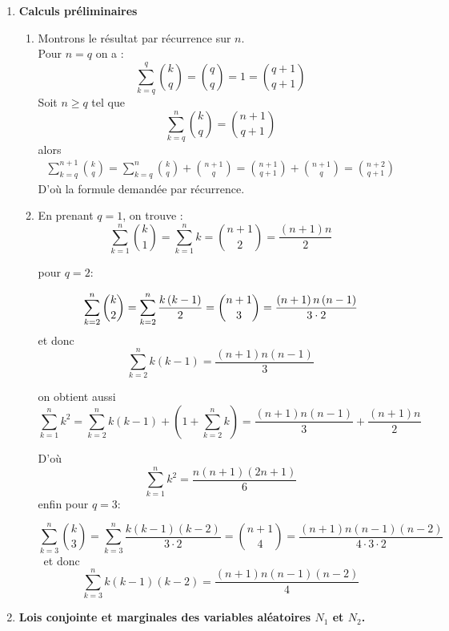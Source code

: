 \begin{enumerate}
\item \textbf{Calculs pr\'eliminaires}

\begin{enumerate}
\item Montrons le résultat par récurrence sur $n$.\\
Pour $n=q$ on a :%
\begin{equation*}
\sum\limits_{k=q}^{q}\binom{k}{q}=\binom{q}{q}=1=\binom{q+1}{q+1}
\end{equation*}%
Soit $n\geq q$ tel que $$\sum\limits_{k=q}^{n}\binom{k}{q}=\binom{n+1}{q+1}$$
alors 
\begin{multline*}
\sum\limits_{k=q}^{n+1}\binom{k}{q}
 = \sum\limits_{k=q}^{n}\binom{k}{q} + \binom{n+1}{q} 
 = \binom{n+1}{q+1}+\binom{n+1}{q} 
 = \binom{n+2}{q+1}
\end{multline*}
D'où la formule demandée par récurrence.

\item En prenant $q=1$, on trouve :
$$\sum\limits_{k=1}^{n}\binom{k}{1}=\sum\limits_{k=1}^{n}k=\binom{n+1}{2}=%
\frac{\left( n+1\right) n}{2}$$

pour $q=2:$

$$\sum\limits_{k=2}^{n}\binom{k}{2} =\sum\limits_{k=2}^{n}\frac{k\left(
k-1\right) }{2}=\binom{n+1}{3}=\frac{\left( n+1\right) n\left( n-1\right) }{%
3\cdot 2} $$
et donc
$$\sum\limits_{k=2}^{n}k\left( k-1\right) =\frac{\left( n+1\right) n\left(
n-1\right) }{3}$$


on obtient aussi 
$$\sum\limits_{k=1}^{n}k^2=\sum\limits_{k=2}^{n}k\left( k-1\right) + \left(1+\sum\limits_{k=2}^{n}k\right)=\frac{\left( n+1\right) n\left(
n-1\right) }{3}+\frac{\left( n+1\right) n}{2}$$

D'où $$\sum\limits_{k=1}^{n}k^2 =\frac{n(n+1)(2n+
1)}6$$
enfin pour $q=3:$

$$\sum\limits_{k=3}^{n}\binom{k}{3} =\sum\limits_{k=3}^{n}\frac{k\left(
k-1\right) \left( k-2\right) }{3\cdot 2}=\binom{n+1}{4}=\frac{\left(
n+1\right) n\left( n-1\right) \left( n-2\right) }{4\cdot 3\cdot 2}$$\
et donc
$$\sum\limits_{k=3}^{n}k\left( k-1\right) \left( k-2\right)=\frac{\left(
n+1\right) n\left( n-1\right) \left( n-2\right) }{4}$$

\end{enumerate}

\item \textbf{Lois conjointe et marginales des variables al\'eatoires $N_{1}$
 et $N_{2}$.}


\end{enumerate}
